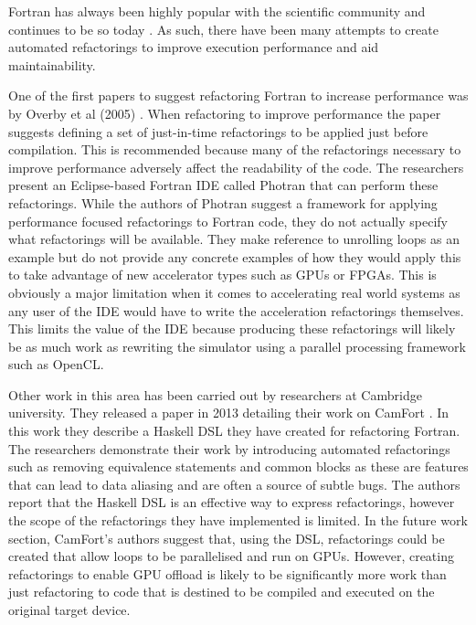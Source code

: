 \documentclass{mpaper}
\begin{document}
Fortran has always been highly popular with the scientific community and continues to be so today  \cite{VanderbauwhedeDavidson2018}. As such, there have been many attempts to create automated refactorings to improve execution performance and aid maintainability. 

One of the first papers to suggest refactoring Fortran to increase performance was by Overby et al (2005) \cite{Overbey2005}. When refactoring to improve performance the paper suggests defining a set of just-in-time refactorings to be applied just before compilation. This is recommended because many of the refactorings necessary to improve performance adversely affect the readability of the code. The researchers present an Eclipse-based Fortran IDE called Photran that can perform these refactorings. While the authors of Photran suggest a framework for applying performance focused refactorings to Fortran code, they do not actually specify what refactorings will be available. They make reference to unrolling loops as an example but do not provide any concrete examples of how they would apply this to take advantage of new accelerator types such as GPUs or FPGAs. This is obviously a major limitation when it comes to accelerating real world systems as any user of the IDE would have to write the acceleration refactorings themselves. This limits the value of the IDE because producing these refactorings will likely be as much work as rewriting the simulator using a parallel processing framework such as OpenCL.

Other work in this area has been carried out by researchers at Cambridge university. They released a paper in 2013 detailing their work on CamFort \cite{Orchard2013}. In this work they describe a Haskell DSL they have created for refactoring Fortran. The researchers demonstrate their work by introducing automated refactorings such as removing equivalence statements and common blocks as these are features that can lead to data aliasing and are often a source of subtle bugs. The authors report that the Haskell DSL is an effective way to express refactorings, however the scope of the refactorings they have implemented is limited. In the future work section, CamFort's authors suggest that, using the DSL, refactorings could be created that allow loops to be parallelised and run on GPUs. However, creating refactorings to enable GPU offload is likely to be significantly more work than just refactoring to code that is destined to be compiled and executed on the original target device.  
\end{document}
